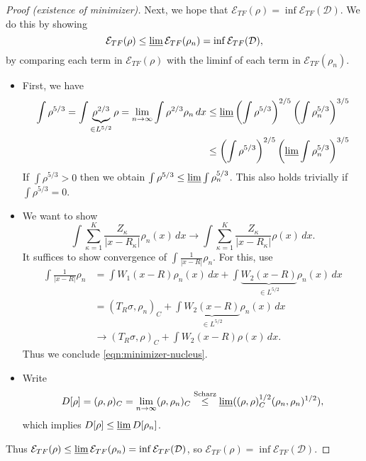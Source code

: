 \documentclass[11pt]{amsart}
\newcommand{\R}{\mathbb{R}}
\renewcommand{\Im}{\operatorname{\mathfrak{Im}}}
\theoremstyle{definition}
\theoremstyle{definition}
\theoremstyle{definition}
\numberwithin{equation}{section}
\begin{document}
\begin{proof}[Proof (existence of minimizer)]
Next, we hope that $\mathcal{E}_{TF}(\rho)=\inf\mathcal{E}_{TF}(\mathcal{D})$. We do this by showing
\begin{equation}
\mathcal{E}_{TF}(\rho)\le\varliminf \mathcal{E}_{TF}(\rho_n)=\inf\mathcal{E}_{TF}(\mathcal{D}),
\end{equation}
by comparing each term in $\mathcal{E}_{TF}(\rho)$ with the liminf of each term in $\mathcal{E}_{TF}(\rho_n)$.
\begin{itemize}
\item First, we have
\begin{align*}
\int\rho^{5/3}=\int\underbrace{\rho^{2/3}}_{\in L^{5/2}}\rho=\lim_{n\to\infty}\int \rho^{2/3}\rho_n\,dx&\le\varliminf\left(\int\rho^{5/3}\right)^{2/5}\left(\int\rho_n^{5/3}\right)^{3/5}\\
&\le\left(\int\rho^{5/3}\right)^{2/5}\left(\varliminf\int \rho_n^{5/3}\right)^{3/5}
\end{align*}
If $\int \rho^{5/3}>0$ then we obtain $\int\rho^{5/3}\le\varliminf\int \rho_n^{5/3}$. This also holds trivially if $\int \rho^{5/3}=0$.
\item We want to show 
\begin{equation}\label{eqn:minimizer-nucleus}
\int\sum_{\kappa=1}^K\frac{Z_\kappa}{|x-R_\kappa|}\rho_n(x)\,dx\to\int\sum_{\kappa=1}^K\frac{Z_\kappa}{|x-R_\kappa|}\rho(x)\,dx.
\end{equation}
It suffices to show convergence of $\int\frac{1}{|x-R|}\rho_n$. For this, use
\begin{align*}
\int\frac{1}{|x-R|}\rho_n&=\int W_1(x-R)\rho_n(x)\,dx+\int\underbrace{W_2(x-R)}_{\in L^{5/2}}\rho_n(x)\,dx\\
&=(T_R\sigma,\rho_n)_C+\int\underbrace{W_2(x-R)}_{\in L^{5/2}}\rho_n(x)\,dx\\
&\longrightarrow (T_R\sigma,\rho)_C+\int W_2(x-R)\rho(x)\,dx.
\end{align*}
Thus we conclude \eqref{eqn:minimizer-nucleus}.

\item Write
\[
D[\rho]=(\rho,\rho)_C=\lim_{n\to\infty}(\rho,\rho_n)_C\stackrel{\text{Scharz}}{\le}\varliminf((\rho,\rho)_C^{1/2}(\rho_n,\rho_n)^{1/2}),
\]
which implies $D[\rho]\le\varliminf D[\rho_n]$.
\end{itemize}
Thus $\mathcal{E}_{TF}(\rho)\le\varliminf\mathcal{E}_{TF}(\rho_n)=\inf\mathcal{E}_{TF}(\mathcal{D})$, so $\mathcal{E}_{TF}(\rho)=\inf\mathcal{E}_{TF}(\mathcal{D})$.


\end{proof}
\end{document}
